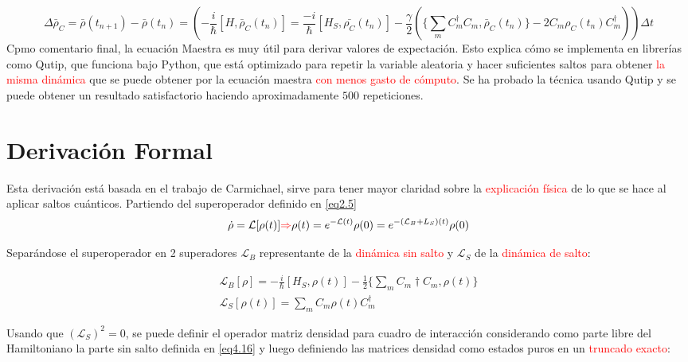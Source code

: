 \documentclass{book}
\begin{document}
\begin{equation}\label{eq4.14} \Delta \bar{\rho}_C= \bar{\rho}(t_{n+1})-\bar{\rho}(t_n)=(-\frac{i}{\hslash}[H,\bar{\rho}_C(t_n)]=\frac{-i}{\hslash}[H_S,\bar{\rho_C}(t_n)]-\frac{\gamma}{2}(\{\sum_m C_m^\dag C_m,\bar{\rho}_C(t_n)\}-2C_m\rho_C(t_n)C_m^\dag))\Delta t\end{equation}
Cpmo comentario final, la ecuación Maestra es muy útil para derivar valores de expectación. Esto explica cómo se implementa en librerías como \textcolor{fgreen}{Qutip}, que funciona bajo \textcolor{fgreen}{Python}, que está optimizado para repetir la variable aleatoria y hacer suficientes saltos para obtener \textcolor{red}{la misma dinámica} que se puede obtener por la ecuación maestra \textcolor{red}{con menos gasto de cómputo}. Se ha probado la técnica usando \textcolor{fgreen}{Qutip} y se puede obtener un resultado satisfactorio haciendo aproximadamente $500$ repeticiones.

\section{Derivación Formal}

Esta derivación está basada en el trabajo de Carmichael, sirve para tener mayor claridad sobre la \textcolor{red}{explicación física} de lo que se hace al aplicar saltos cuánticos. Partiendo del superoperador definido en \ref{eq2.5}
\begin{equation}\label{eq4.15}\dot{\rho}=\mathcal{L}[\rho(t)]\textcolor{red}{\Rightarrow} \rho(t)=e^{-\mathcal{L}(t)}\rho(0)=e^{-(\mathcal{L}_B+L_S)(t)}\rho(0)\end{equation}

Separándose el superoperador en 2 superadores $\mathcal{L}_B$ representante de la \textcolor{red}{dinámica sin salto} y $\mathcal{L}_S$ de la \textcolor{red}{dinámica de salto}:

\begin{equation}\label{eq4.16}\begin{aligned}\mathcal{L}_B[\rho]=-\frac{i}{\hslash}[H_S, \rho(t)]-\frac{1}{2}\{\sum_m C_m \dag C_m,\rho(t)\}\\\mathcal{L}_S[\rho(t)]=\sum_m C_m \rho(t)C_m^ \dag \end{aligned}\end{equation} 

Usando que $(\mathcal{L}_S)^2=0$, se puede definir el operador matriz densidad para cuadro de interacción considerando como parte libre del Hamiltoniano la parte sin salto definida en \ref{eq4.16} y luego definiendo las matrices densidad como estados puros en un \textcolor{red}{truncado exacto}:
\end{document}
